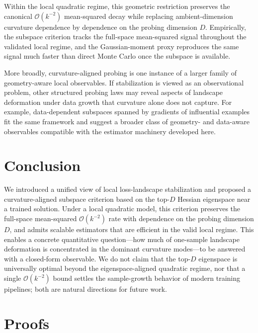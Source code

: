 \documentclass{article}
\begin{document}
Within the local quadratic regime, this geometric restriction preserves the canonical $\mathcal O(k^{-2})$ mean-squared decay while replacing ambient-dimension curvature dependence by dependence on the probing dimension $D$. Empirically, the subspace criterion tracks the full-space mean-squared signal throughout the validated local regime, and the Gaussian-moment proxy reproduces the same signal much faster than direct Monte Carlo once the subspace is available.

More broadly, curvature-aligned probing is one instance of a larger family of geometry-aware local observables. If stabilization is viewed as an observational problem, other structured probing laws may reveal aspects of landscape deformation under data growth that curvature alone does not capture. For example, data-dependent subspaces spanned by gradients of influential examples fit the same framework and suggest a broader class of geometry- and data-aware observables compatible with the estimator machinery developed here.

\section{Conclusion}
\label{sec:conclusion}

We introduced a unified view of local loss-landscape stabilization and proposed a curvature-aligned subspace criterion based on the top-$D$ Hessian eigenspace near a trained solution. Under a local quadratic model, this criterion preserves the full-space mean-squared $\mathcal O(k^{-2})$ rate with dependence on the probing dimension $D$, and admits scalable estimators that are efficient in the valid local regime. This enables a concrete quantitative question---how much of one-sample landscape deformation is concentrated in the dominant curvature modes---to be answered with a closed-form observable. We do not claim that the top-$D$ eigenspace is universally optimal beyond the eigenspace-aligned quadratic regime, nor that a single $\mathcal O(k^{-2})$ bound settles the sample-growth behavior of modern training pipelines; both are natural directions for future work.









\appendix

\section{Proofs}
\label{app:proofs}
\end{document}
